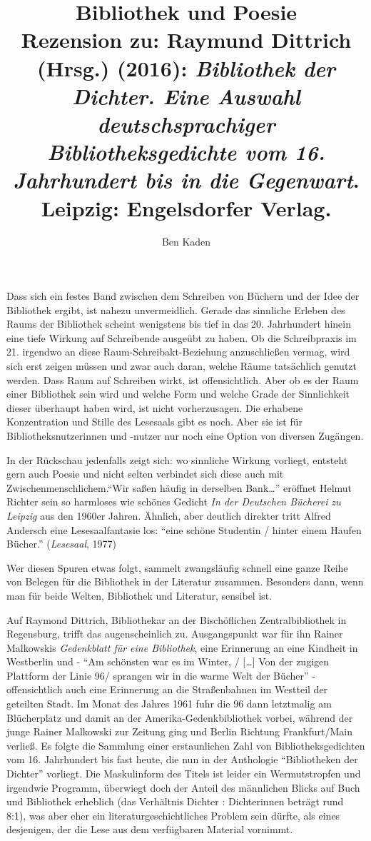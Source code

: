 \documentclass[a4paper,
fontsize=11pt,
oneside,
numbers=noperiodatend,
parskip=half-,
bibliography=totoc,
final
]{scrartcl}
\title{\LARGE{Bibliothek und Poesie} \\ Rezension zu: Raymund Dittrich (Hrsg.) (2016): \emph{Bibliothek der Dichter. Eine Auswahl deutschsprachiger Bibliotheksgedichte vom 16. Jahrhundert bis in die Gegenwart}. Leipzig: Engelsdorfer Verlag.
} %
\author{Ben Kaden} %
\date{}
\begin{document}
\maketitle
\thispagestyle{fancyplain} 


Dass sich ein festes Band zwischen dem Schreiben von Büchern und der
Idee der Bibliothek ergibt, ist nahezu unvermeidlich. Gerade das
sinnliche Erleben des Raums der Bibliothek scheint wenigstens bis tief
in das 20. Jahrhundert hinein eine tiefe Wirkung auf Schreibende
ausgeübt zu haben. Ob die Schreibpraxis im 21. irgendwo an diese
Raum-Schreibakt-Beziehung anzuschließen vermag, wird sich erst zeigen
müssen und zwar auch daran, welche Räume tatsächlich genutzt werden.
Dass Raum auf Schreiben wirkt, ist offensichtlich. Aber ob es der Raum
einer Bibliothek sein wird und welche Form und welche Grade der
Sinnlichkeit dieser überhaupt haben wird, ist nicht vorherzusagen. Die
erhabene Konzentration und Stille des Lesesaals gibt es noch. Aber sie
ist für Bibliotheksnutzerinnen und -nutzer nur noch eine Option von
diversen Zugängen.

In der Rückschau jedenfalls zeigt sich: wo sinnliche Wirkung vorliegt,
entsteht gern auch Poesie und nicht selten verbindet sich diese auch mit
Zwischenmenschlichem.\enquote{Wir saßen häufig in derselben
Bank\ldots{}} eröffnet Helmut Richter sein so harmloses wie schönes
Gedicht \emph{In der Deutschen Bücherei zu Leipzig} aus den 1960er
Jahren. Ähnlich, aber deutlich direkter tritt Alfred Andersch eine
Lesesaalfantasie los: \enquote{eine schöne Studentin / hinter einem
Haufen Bücher.} (\emph{Lesesaal}, 1977)

Wer diesen Spuren etwas folgt, sammelt zwangsläufig schnell eine ganze
Reihe von Belegen für die Bibliothek in der Literatur zusammen.
Besonders dann, wenn man für beide Welten, Bibliothek und Literatur,
sensibel ist.

Auf Raymond Dittrich, Bibliothekar an der Bischöflichen
Zentralbibliothek in Regensburg, trifft das augenscheinlich zu.
Ausgangspunkt war für ihn Rainer Malkowskis \emph{Gedenkblatt für eine
Bibliothek}, eine Erinnerung an eine Kindheit in Westberlin und -
\enquote{Am schönsten war es im Winter, / {[}\ldots{}{]} Von der zugigen
Plattform der Linie 96/ sprangen wir in die warme Welt der Bücher} -
offensichtlich auch eine Erinnerung an die Straßenbahnen im Westteil der
geteilten Stadt. Im Monat des Jahres 1961 fuhr die 96 dann letztmalig am
Blücherplatz und damit an der Amerika-Gedenkbibliothek vorbei, während
der junge Rainer Malkowski zur Zeitung ging und Berlin Richtung
Frankfurt/Main verließ. Es folgte die Sammlung einer erstaunlichen Zahl
von Bibliotheksgedichten vom 16. Jahrhundert bis fast heute, die nun in
der Anthologie \enquote{Bibliotheken der Dichter} vorliegt. Die
Maskulinform des Titels ist leider ein Wermutstropfen und irgendwie
Programm, überwiegt doch der Anteil des männlichen Blicks auf Buch und
Bibliothek erheblich (das Verhältnis Dichter : Dichterinnen beträgt rund
8:1), was aber eher ein literaturgeschichtliches Problem sein dürfte,
als eines desjenigen, der die Lese aus dem verfügbaren Material
vornimmt.
\end{document}
